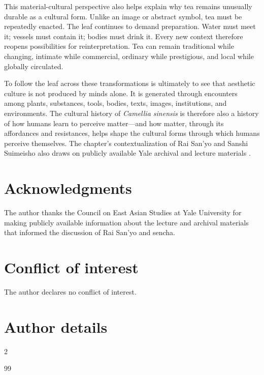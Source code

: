 \documentclass[numbers]{IntechOpen-Book}
\begin{document}
\begin{backmatter}
This material-cultural perspective also helps explain why tea remains unusually durable as a cultural form. Unlike an image or abstract symbol, tea must be repeatedly enacted. The leaf continues to demand preparation. Water must meet it; vessels must contain it; bodies must drink it. Every new context therefore reopens possibilities for reinterpretation. Tea can remain traditional while changing, intimate while commercial, ordinary while prestigious, and local while globally circulated.

To follow the leaf across these transformations is ultimately to see that aesthetic culture is not produced by minds alone. It is generated through encounters among plants, substances, tools, bodies, texts, images, institutions, and environments. The cultural history of \textit{Camellia sinensis} is therefore also a history of how humans learn to perceive matter---and how matter, through its affordances and resistances, helps shape the cultural forms through which humans perceive themselves. The chapter's contextualization of Rai San'yo and Sanshi Suimeisho also draws on publicly available Yale archival and lecture materials \cite{yale}.

\section*{Acknowledgments}
The author thanks the Council on East Asian Studies at Yale University for making publicly available information about the lecture and archival materials that informed the discussion of Rai San'yo and sencha.

\section*{Conflict of interest}
The author declares no conflict of interest.

\section*{Author details}
\begin{authordetails}
\author{Vivien Jiaqian Zhu}
\address[1]{Stanford University, Stanford, California, United States}
\address{*Address all correspondence to: jvzhu@stanford.edu}
\end{authordetails}

\begin{multicols}{2}
\begin{thebibliography}{99}


\end{thebibliography}
\end{multicols}
\end{backmatter}
\end{document}
